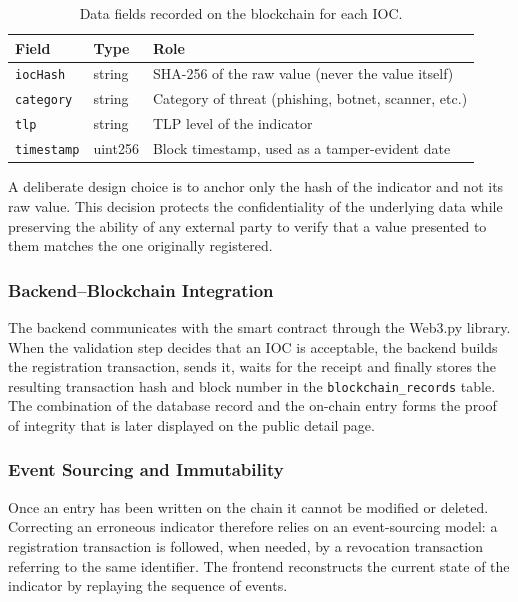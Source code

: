 \documentclass[12pt,a4paper,oneside]{book}
\begin{document}
{{\begin{table}[!h]
\caption{Data fields recorded on the blockchain for each IOC.}
\label{tab:onchain}
\centering
\renewcommand{\arraystretch}{1.4}
\begin{tabular}{| C{.18\textwidth} | C{.12\textwidth} | p{.55\textwidth} |}
\hline
\textbf{Field} & \textbf{Type} & \textbf{Role} \\
\hline\hline
\texttt{iocHash}   & string  & \nohyphens{SHA-256 of the raw value (never the value itself)} \\
\hline
\texttt{category}  & string  & \nohyphens{Category of threat (phishing, botnet, scanner, etc.)} \\
\hline
\texttt{tlp}       & string  & \nohyphens{TLP level of the indicator} \\
\hline
\texttt{timestamp} & uint256 & \nohyphens{Block timestamp, used as a tamper-evident date} \\
\hline
\end{tabular}
\end{table}

A deliberate design choice is to anchor only the hash of the indicator and
not its raw value. This decision protects the confidentiality of the
underlying data while preserving the ability of any external party to
verify that a value presented to them matches the one originally registered.

\subsubsection{Backend--Blockchain Integration}
The backend communicates with the smart contract through the Web3.py
library. When the validation step decides that an IOC is acceptable, the
backend builds the registration transaction, sends it, waits for the
receipt and finally stores the resulting transaction hash and block number
in the \texttt{blockchain\_records} table. The combination of the database
record and the on-chain entry forms the proof of integrity that is later
displayed on the public detail page.

\subsubsection{Event Sourcing and Immutability}
Once an entry has been written on the chain it cannot be modified or
deleted. Correcting an erroneous indicator therefore relies on an
event-sourcing model: a registration transaction is followed, when needed,
by a revocation transaction referring to the same identifier. The frontend
reconstructs the current state of the indicator by replaying the sequence
of events.

}}
\end{document}
